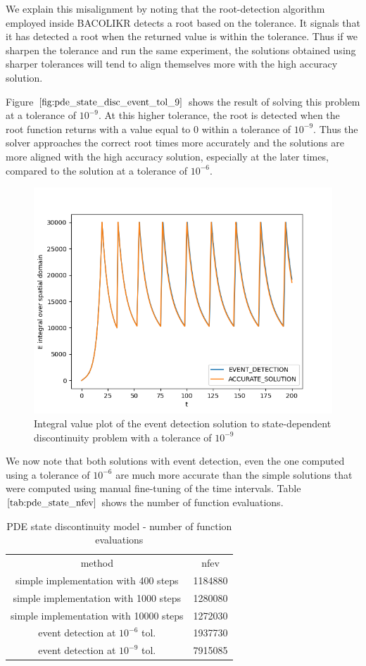 \documentclass{article}
\begin{document}
We explain this misalignment by noting that the root-detection algorithm employed inside BACOLIKR detects a root based on the tolerance. It signals that it has detected a root when the returned value is within the tolerance. Thus if we sharpen the tolerance and run the same experiment, the solutions obtained using sharper tolerances will tend to align themselves more with the high accuracy solution.

Figure $\ref{fig:pde_state_disc_event_tol_9}$ shows the result of solving this problem at a tolerance of $10^{-9}$. At this higher tolerance, the root is detected when the root function returns with a value equal to 0 within a tolerance of $10^{-9}$. Thus the solver approaches the correct root times more accurately and the solutions are more aligned with the high accuracy solution, especially at the later times, compared to the solution at a tolerance of $10^{-6}$.


\begin{figure}[H]
\centering
\includegraphics[width=0.7\linewidth]{./figures/pde_state_disc_event_tol_9}
\caption{Integral value plot of the event detection solution to state-dependent discontinuity problem with a tolerance of $10^{-9}$}
\label{fig:pde_state_disc_event_tol_9}
\end{figure}

We now note that both solutions with event detection, even the one computed using a tolerance of $10^{-6}$ are much more accurate than the simple solutions that were computed using manual fine-tuning of the time intervals. Table $\ref{tab:pde_state_nfev}$ shows the number of function evaluations. 

\begin{table}[h]
\caption {PDE state discontinuity model - number of function evaluations} 
\label{tab:pde_state_nfev}
\begin{center}
\begin{tabular}{ c c } 
method & nfev \\ 
simple implementation with 400 steps   & 1184880 \\
simple implementation with 1000 steps  & 1280080 \\
simple implementation with 10000 steps & 1272030 \\
event detection at $10^{-6}$ tol.     & 1937730 \\
event detection at $10^{-9}$ tol.     & 7915085 \\
\end{tabular}
\end{center}
\end{table}
\end{document}
